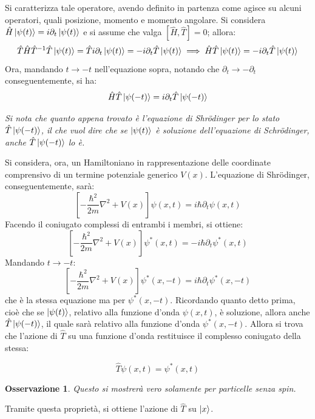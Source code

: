 \documentclass[11pt, a4paper]{scrartcl} %
\numberwithin{equation}{subsection}
\theoremstyle{style2}
\newtheorem{osservazione}{Osservazione}[section]
\theoremstyle{style1}
\newenvironment{boxenv}[1][]{
    \begin{eqbox}[#1]
    }{
   \end{eqbox}
}
\begin{document}
Si caratterizza tale operatore, avendo definito in partenza come agisce su alcuni operatori, quali posizione, momento e momento angolare.
Si considera $\hat{H}\ket{\psi (t)} = i \partial _t \ket{\psi (t)} $ e si assume che valga $[\hat{H}, \hat{T}] =0 $; allora:
\[
\hat{T}\hat{H} \hat{T}^{-1} \hat{T}\ket{\psi (t)}  = \hat{T} i \partial _t \ket{\psi (t)} = -i \partial _t \hat{T}\ket{\psi (t)} \implies \hat{H} \hat{T}\ket{\psi (t)}  = - i \partial _t \hat{T} \ket{\psi (t)} 
\] 
Ora, mandando $t \to - t$ nell'equazione sopra, notando che $\partial _t \to - \partial _t$ conseguentemente, si ha:
\[
\hat{H} \hat{T} \ket{\psi (-t)} = i \partial _t \hat{T}\ket{\psi (-t)} 
\] 
\begin{boxenv}[]
\begin{center}
	\textit{Si nota che quanto appena trovato \`e l'equazione di Shr\"odinger per lo stato $\hat{T}\ket{\psi (-t)} $, il che vuol dire che se $\ket{\psi (t)} $ \`e soluzione dell'equazione di Schr\"odinger, anche $\hat{T}\ket{\psi (-t)} $ lo \`e.} 
\end{center}
\end{boxenv}
Si considera, ora, un Hamiltoniano in rappresentazione delle coordinate comprensivo di un termine potenziale generico $V(x)$.
L'equazione di Shr\"odinger, conseguentemente, sar\`a:
\[
\left[ - \frac{\hbar ^2}{2m}\nabla ^2 + V(x) \right] \psi (x,t) = i\hbar  \partial _t \psi (x,t)
\] 
Facendo il coniugato complessi di entrambi i membri, si ottiene:
\[
\left[ -\frac{\hbar ^2}{2m}\nabla ^2 + V(x) \right] \psi ^*(x,t) = - i\hbar \partial _t \psi ^* (x,t)
\] 
Mandando $t\to - t$:
\[
\left[ -\frac{\hbar ^2}{2m}\nabla ^2 + V(x) \right] \psi ^* (x,-t) = i \hbar  \partial _t \psi^* (x,-t)
\] 
che \`e la stessa equazione ma per $\psi ^*(x,-t)$.
Ricordando quanto detto prima, cio\`e che se $\ket{\psi (t)} $, relativo alla funzione d'onda $\psi (x,t)$, \`e soluzione, allora anche $\hat{T}\ket{\psi (-t)} $, il quale sar\`a relativo alla funzione d'onda $\psi ^*(x,-t)$.
Allora si trova che l'azione di $\hat{T}$ su una funzione d'onda restituisce il complesso coniugato della stessa:
\begin{boxenv}[]
\begin{equation}
	\hat{T}\psi (x,t) = \psi ^*(x,t)
\end{equation}
\end{boxenv}
\begin{osservazione}
Questo si mostrer\`a vero solamente per particelle senza spin.	
\end{osservazione}
Tramite questa propriet\`a, si ottiene l'azione di $\hat{T}$ su $\ket{x} $.
\end{document}
